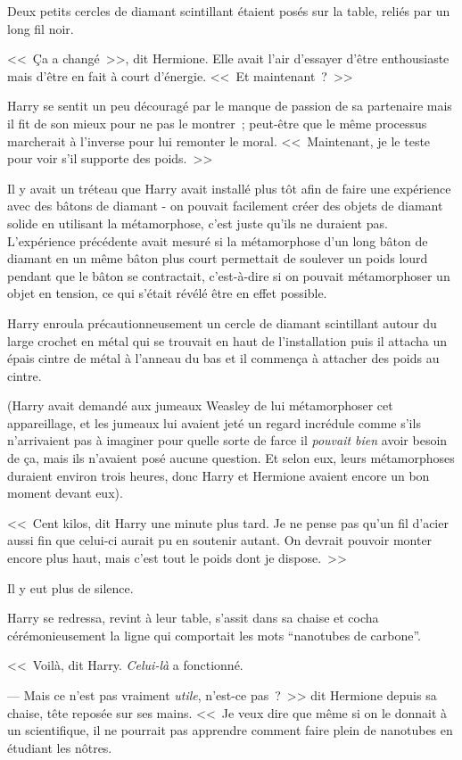 Deux petits cercles de diamant scintillant étaient posés sur la table, reliés par un long fil noir.

<<~Ça a changé~>>, dit Hermione. Elle avait l'air d'essayer d'être enthousiaste mais d'être en fait à court d'énergie. <<~Et maintenant~?~>>

Harry se sentit un peu découragé par le manque de passion de sa partenaire mais il fit de son mieux pour ne pas le montrer~; peut-être que le même processus marcherait à l'inverse pour lui remonter le moral. <<~Maintenant, je le teste pour voir s'il supporte des poids.~>>

Il y avait un tréteau que Harry avait installé plus tôt afin de faire une expérience avec des bâtons de diamant - on pouvait facilement créer des objets de diamant solide en utilisant la métamorphose, c'est juste qu'ils ne duraient pas. L'expérience précédente avait mesuré si la métamorphose d'un long bâton de diamant en un même bâton plus court permettait de soulever un poids lourd pendant que le bâton se contractait, c'est-à-dire si on pouvait métamorphoser un objet en tension, ce qui s'était révélé être en effet possible.

Harry enroula précautionneusement un cercle de diamant scintillant autour du large crochet en métal qui se trouvait en haut de l'installation puis il attacha un épais cintre de métal à l'anneau du bas et il commença à attacher des poids au cintre.

(Harry avait demandé aux jumeaux Weasley de lui métamorphoser cet appareillage, et les jumeaux lui avaient jeté un regard incrédule comme s'ils n'arrivaient pas à imaginer pour quelle sorte de farce il \emph{pouvait bien} avoir besoin de ça, mais ils n'avaient posé aucune question. Et selon eux, leurs métamorphoses duraient environ trois heures, donc Harry et Hermione avaient encore un bon moment devant eux).

<<~Cent kilos, dit Harry une minute plus tard. Je ne pense pas qu'un fil d'acier aussi fin que celui-ci aurait pu en soutenir autant. On devrait pouvoir monter encore plus haut, mais c'est tout le poids dont je dispose.~>>

Il y eut plus de silence.

Harry se redressa, revint à leur table, s'assit dans sa chaise et cocha cérémonieusement la ligne qui comportait les mots “nanotubes de carbone”.

<<~Voilà, dit Harry. \emph{Celui-là} a fonctionné.

--- Mais ce n'est pas vraiment \emph{utile}, n'est-ce pas~?~>> dit Hermione depuis sa chaise, tête reposée sur ses mains. <<~Je veux dire que même si on le donnait à un scientifique, il ne pourrait pas apprendre comment faire plein de nanotubes en étudiant les nôtres.

